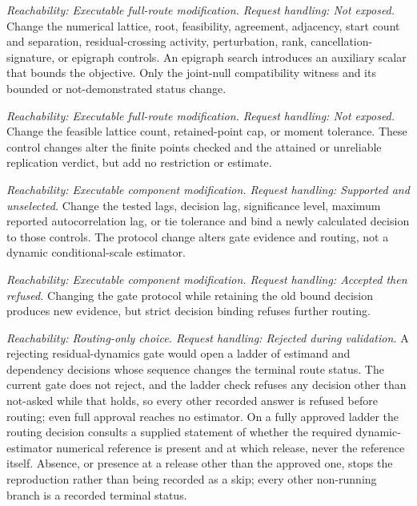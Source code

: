 \documentclass[11pt]{article}
\begin{document}
\begin{description}[style=nextline]
\item[Joint-null search controls.]
\emph{Reachability: Executable full-route modification. Request handling: Not exposed.}
Change the numerical lattice, root, feasibility, agreement, adjacency, start count and separation,
residual-crossing activity, perturbation, rank, cancellation-signature, or epigraph controls. An
epigraph search introduces an auxiliary scalar that bounds the objective.
Only the joint-null compatibility witness and its bounded or
not-demonstrated status change.

\item[Stacked-moment replication controls.]
\emph{Reachability: Executable full-route modification. Request handling: Not exposed.}
Change the feasible lattice count, retained-point cap, or moment tolerance. These control changes alter the finite
points checked and the attained or unreliable replication verdict, but add no restriction or
estimate.

\item[Residual-dynamics protocol.]
\emph{Reachability: Executable component modification. Request handling: Supported and unselected.}
Change the tested lags, decision lag, significance level, maximum reported autocorrelation lag, or
tie tolerance and bind a newly calculated decision to those controls. The protocol change alters gate evidence and
routing, not a dynamic conditional-scale estimator.

\item[Residual-dynamics change without a new decision.]
\emph{Reachability: Executable component modification. Request handling: Accepted then refused.}
Changing the gate protocol while retaining the old bound decision produces new evidence, but strict
decision binding refuses further routing.

\item[Post-rejection dynamic-model decisions.]
\emph{Reachability: Routing-only choice. Request handling: Rejected during validation.}
A rejecting residual-dynamics gate would open a ladder of estimand and dependency decisions whose
sequence changes the terminal route status. The current gate does not reject, and the ladder check
refuses any decision other than not-asked while that holds, so every other recorded answer is
refused before routing; even
full approval reaches no estimator. On a fully approved ladder the routing decision consults a
supplied statement of whether the required dynamic-estimator numerical reference is present and at which
release, never the reference itself. Absence, or presence at a release other than the approved one,
stops the reproduction rather than being recorded as a skip; every other non-running branch is a
recorded terminal status.


\end{description}
\end{document}
